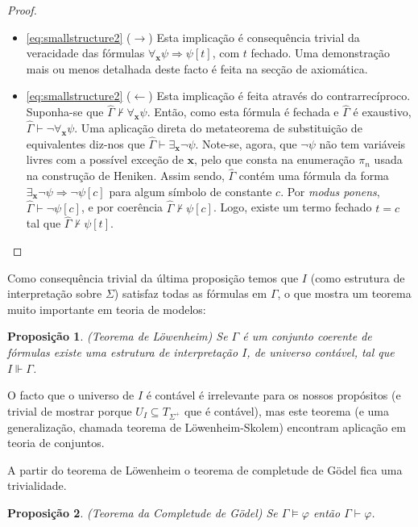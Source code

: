 \documentclass{report}
\newtheorem{prop}{Proposição}
\theoremstyle{definition}
\theoremstyle{remark}
\renewcommand{\bf}[1]{\mathbf{#1}}
\newcommand{\imply}{\mathbin{\Rightarrow}}
\begin{document}
\begin{proof}
\begin{itemize}
	\item \eqref{eq:smallstructure2} ($\rightarrow$) Esta implicação é consequência trivial da veracidade das fórmulas $\forall_{\bf x} \psi \imply \psi[t]$, com $t$ fechado. Uma demonstração mais ou menos detalhada deste facto é feita na secção de axiomática.

	\item \eqref{eq:smallstructure2} ($\leftarrow$) Esta implicação é feita através do contrarrecíproco. Suponha-se que $\widehat\Gamma \nvdash \forall_{\bf x} \psi$. Então, como esta fórmula é fechada e $\widehat\Gamma$ é exaustivo, $\widehat\Gamma \vdash \neg \forall_{\bf x} \psi$. Uma aplicação direta do metateorema de substituição de equivalentes diz-nos que $\widehat\Gamma \vdash \exists_{\bf x} \neg \psi$. Note-se, agora, que $\neg \psi$ não tem variáveis livres com a possível exceção de $\bf x$, pelo que consta na enumeração $\pi_n$ usada na construção de Heniken. Assim sendo, $\widehat\Gamma$ contém uma fórmula da forma $\exists_{\bf x} \neg \psi \imply \neg \psi[c]$ para algum símbolo de constante $c$. Por \textit{modus ponens}, $\widehat\Gamma \vdash \neg \psi[c]$, e por coerência $\widehat\Gamma \nvdash \psi[c]$. Logo, existe um termo fechado $t = c$ tal que $\widehat\Gamma \nvdash \psi[t]$.
	\end{itemize}
	\end{proof}

	Como consequência trivial da última proposição temos que $I$ (como estrutura de interpretação sobre $\Sigma$) satisfaz todas as fórmulas em $\Gamma$, o que mostra um teorema muito importante em teoria de modelos:

	\begin{prop} (Teorema de Löwenheim) Se $\Gamma$ é um conjunto coerente de fórmulas existe uma estrutura de interpretação $I$, de universo contável, tal que $I \Vdash \Gamma$.
	\end{prop}

	O facto que o universo de $I$ é contável é irrelevante para os nossos propósitos (e trivial de mostrar porque $U_I \subseteq T_{\Sigma^+}$ que é contável), mas este teorema (e uma generalização, chamada teorema de Löwenheim-Skolem) encontram aplicação em teoria de conjuntos.

	A partir do teorema de Löwenheim o teorema de completude de Gödel fica uma trivialidade.

	\begin{prop} (Teorema da Completude de Gödel)
	Se $\Gamma \vDash \varphi$ então $\Gamma \vdash \varphi$.
	\end{prop}
\end{document}
